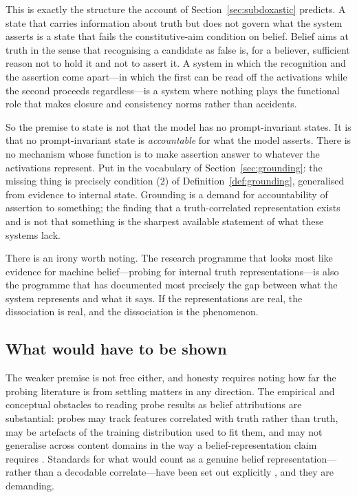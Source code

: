 This is exactly the structure the account of Section~\ref{sec:subdoxastic}
predicts. A state that carries information about truth but does not govern what
the system asserts is a state that fails the constitutive-aim condition on
belief. Belief aims at truth in the sense that recognising a candidate as false
is, for a believer, sufficient reason not to hold it and not to assert it. A
system in which the recognition and the assertion come apart---in which the first
can be read off the activations while the second proceeds regardless---is a system
where nothing plays the functional role that makes closure and consistency norms
rather than accidents.

So the premise to state is not that the model has no prompt-invariant states. It
is that no prompt-invariant state is \emph{accountable} for what the model
asserts. There is no mechanism whose function is to make assertion answer to
whatever the activations represent. Put in the vocabulary of
Section~\ref{sec:grounding}: the missing thing is precisely condition (2) of
Definition~\ref{def:grounding}, generalised from evidence to internal state.
Grounding is a demand for accountability of assertion to something; the finding
that a truth-correlated representation exists and is not that something is the
sharpest available statement of what these systems lack.

There is an irony worth noting. The research programme that looks most like
evidence for machine belief---probing for internal truth representations---is
also the programme that has documented most precisely the gap between what the
system represents and what it says. If the representations are real, the
dissociation is real, and the dissociation is the phenomenon.

\subsection{What would have to be shown}
\label{sec:probing-limits}

The weaker premise is not free either, and honesty requires noting how far the
probing literature is from settling matters in any direction. The empirical and
conceptual obstacles to reading probe results as belief attributions are
substantial: probes may track features correlated with truth rather than truth,
may be artefacts of the training distribution used to fit them, and may not
generalise across content domains in the way a belief-representation claim
requires \citep{levinstein2024}. Standards for what would count as a genuine
belief representation---rather than a decodable correlate---have been set out
explicitly \citep{herrmann2024}, and they are demanding.

